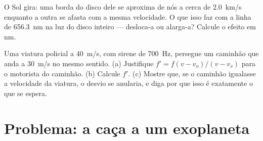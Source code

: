 \begin{exercise}[$\star\star\star$]\label{exo:g12:doppler-effect:14}
O Sol gira: uma borda do disco dele se aproxima de nós a cerca de
\qty{2.0}{km/s} enquanto a outra se afasta com a mesma velocidade. O que
isso faz com a linha de \qty{656.3}{nm} na luz do disco inteiro ---
desloca-a ou alarga-a? Calcule o efeito em \unit{nm}.
\end{exercise}

\begin{exercise}[$\star\star\star$]\label{exo:g12:doppler-effect:15}
Uma viatura policial a \qty{40}{m/s}, com sirene de \qty{700}{Hz},
persegue um caminhão que anda a \qty{30}{m/s} no mesmo sentido.
(a) Justifique $f' = f(v - v_o)/(v - v_s)$ para o motorista do caminhão.
(b) Calcule $f'$. (c) Mostre que, se o caminhão igualasse a velocidade da
viatura, o desvio se anularia, e diga por que isso é exatamente o que se
espera.
\end{exercise}

\section{Problema: a caça a um exoplaneta}

